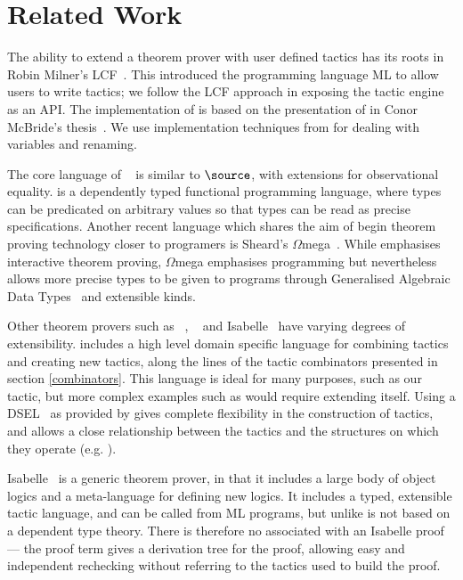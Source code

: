\section{Related Work}

The ability to extend a theorem prover with user defined tactics has
its roots in Robin Milner's LCF~\cite{lcf-milner}. This introduced the
programming language ML to allow users to write tactics; we follow the
LCF approach in exposing the tactic engine as an API. 
The implementation of \Ivor{} is based on the
presentation of \Oleg{} in Conor McBride's
thesis~\cite{mcbride-thesis}. We use implementation
techniques from \cite{not-a-number} for dealing with variables and
renaming.

The core language of \Epigram{}~\cite{view-left,epireloaded} is
similar to $\source$, with extensions for observational
equality. \Epigram{} is a dependently typed functional programming
language, where types can be predicated on arbitrary values so that
types can be read as precise specifications.
Another recent language which shares the aim of begin theorem proving
technology closer to programers is Sheard's
$\Omega$mega~\cite{sheard-langfuture}. While \Ivor{} emphasises
interactive theorem proving, $\Omega$mega emphasises programming but
nevertheless allows more precise types to be given to programs through
Generalised Algebraic Data Types~\cite{gadts} and extensible
kinds. 

Other theorem provers such as \Coq{}~\cite{coq-manual},
\Agda{}~\cite{agda} and Isabelle~\cite{isabelle} have varying degrees
of extensibility. 
\Coq{} includes a high level domain specific language for
combining tactics and creating new tactics, along the lines of the
tactic combinators presented in section \ref{combinators}. This
language is ideal for many purposes, such as our 
tactic, but more complex examples such as  would
require extending \Coq{} itself. Using a
DSEL~\cite{hudak-edsl} as provided by \Ivor{} gives complete
flexibility in the construction of tactics, and allows a close
relationship between the tactics and the structures on which they
operate (e.g. ). 

Isabelle~\cite{isabelle} is a
generic theorem prover, in that it includes a large body of object
logics and a meta-language for defining new logics. It includes a
typed, extensible tactic language, and can be called from ML programs,
but unlike \Ivor{} is not based on a dependent type theory.
There is therefore no  associated with an Isabelle
proof --- the proof term gives a derivation tree for the
proof, allowing easy and independent rechecking without referring to
the tactics used to build the proof. 

